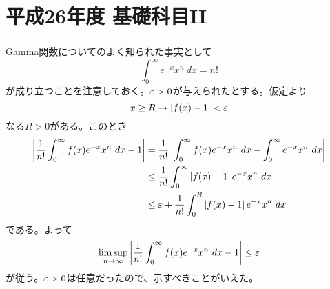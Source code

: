 \section{平成26年度 基礎科目II}

\subsubsection{}%
\barquo{
実数値関数$f(x)$は$[0,\infty)$で連続で$\lim_{x \to \infty} f(x) = 1$とする。このとき
\[
\lim_{n \to \infty} \f{1}{n !} \int_0^{\infty} f(x) e^{-x} x^n \ dx = 1
\]
であることを証明せよ。
}
\begin{sol}
  Gamma関数についてのよく知られた事実として
  \[
  \int_0^{\infty} e^{-x} x^n \ dx = n !
  \]
  が成り立つことを注意しておく。${\varepsilon} > 0$が与えられたとする。仮定より
  \[
  x \geq R \to \left \lvert f(x) - 1 \right \rvert < {\varepsilon}
  \]
  なる$R > 0$がある。このとき
  \begin{align*}
    \abs{ \f{1}{n !} \int_0^{\infty} f(x) e^{-x} x^n \ dx - 1} &= \f{1}{n !}  \abs{ \int_0^{\infty} f(x) e^{-x} x^n \ dx - \int_0^{\infty} e^{-x} x^n \ dx} \\
    &\leq \f{1}{n !} \int_0^{\infty} \abs{  f(x) - 1} e^{-x} x^n  \ dx \\
    &\leq \ve + \f{1}{n !} \int_0^{R} \abs{  f(x) - 1} e^{-x} x^n  \ dx
  \end{align*}
  である。よって
  \[
  \limsup_{n \to \infty} \left \lvert  \frac{1}{n !} \int_0^{\infty} f(x) e^{-x} x^n \ dx - 1 \right \rvert \leq {\varepsilon}
  \]
  が従う。${\varepsilon} > 0$は任意だったので、示すべきことがいえた。
\end{sol}

\newpage


